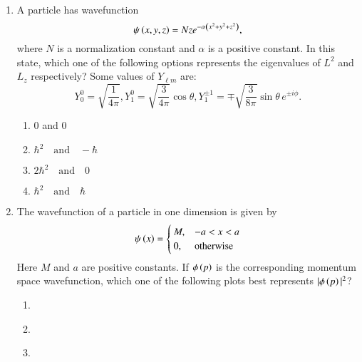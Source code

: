 \documentclass[journal]{IEEEtran}
\begin{document}
\begin{enumerate}
\begin{enumerate}
\item 
\begin{figure}[H]
	\centering
	
\end{figure}
\item \begin{figure}[H]
	\centering
	
\end{figure}  
\item \begin{figure}[H]
	\centering
	
\end{figure} 
\end{enumerate}
\item A particle has wavefunction 
\[
	\psi\left(x, y, z\right) = N z e^{-\alpha\left(x^2 + y^2 + z^2\right)},
\]
where $N$ is a normalization constant and $\alpha$ is a positive constant. In this state, which one of the following options represents the eigenvalues of $L^2$ and $L_z$ respectively? Some values of $Y_{\ell m}$ are:
\[
Y_{0}^{0} = \sqrt{\frac{1}{4\pi}}, Y_{1}^{0} = \sqrt{\frac{3}{4\pi}} \cos \theta,  Y_{1}^{\pm 1} = \mp \sqrt{\frac{3}{8\pi}} \sin \theta \, e^{\pm i\phi}.
\]
\begin{enumerate}
\item 0 and 0
\item $\hbar^2 \quad \text{and} \quad -\hbar$
\item $2\hbar^2 \quad \text{and} \quad 0$
\item $\hbar^2 \quad \text{and} \quad \hbar$
\end{enumerate}
\item The wavefunction of a particle in one dimension is given by
\[
	\psi\left(x\right) = 
\begin{cases} 
M, & -a < x < a \\
0, & \text{otherwise} 
\end{cases}
\]
Here $M$ and $a$ are positive constants. If $\phi\left(p\right)$ is the corresponding momentum space wavefunction, which one of the following plots best represents $|\phi\left(p\right)|^2$?
\begin{enumerate}
\item \begin{figure}[H]
	\centering
	
\end{figure} 
\item \begin{figure}[H]
	\centering
	
\end{figure} 
\item \begin{figure}[H]

\end{figure}
\end{enumerate}
\end{enumerate}
\end{document}

